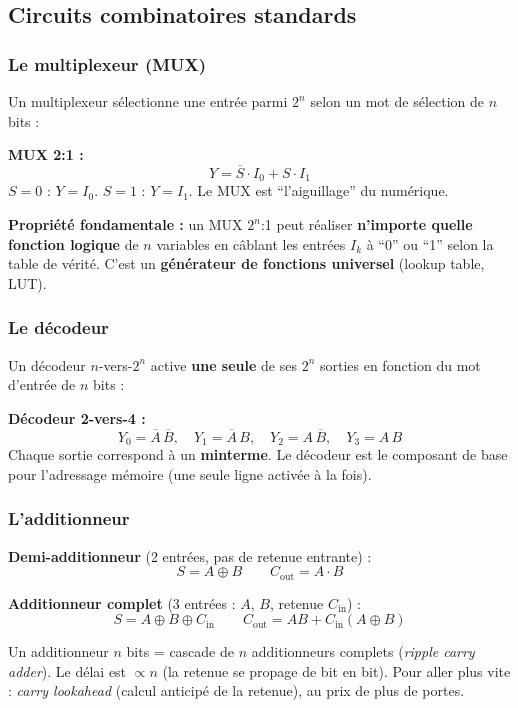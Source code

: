 \documentclass[12pt,a4paper,twoside]{book}
\begin{document}
\subsection{Circuits combinatoires standards}

\subsubsection*{Le multiplexeur (MUX)}

Un multiplexeur sélectionne une entrée parmi $2^n$ selon un mot de sélection de $n$ bits :

\begin{formule}
\textbf{MUX 2:1 :}
\[
Y = \overline{S} \cdot I_0 + S \cdot I_1
\]
$S = 0$ : $Y = I_0$. $S = 1$ : $Y = I_1$. Le MUX est ``l'aiguillage'' du numérique.

\textbf{Propriété fondamentale :} un MUX $2^n$:1 peut réaliser \textbf{n'importe quelle fonction logique} de $n$ variables en câblant les entrées $I_k$ à ``0'' ou ``1'' selon la table de vérité. C'est un \textbf{générateur de fonctions universel} (lookup table, LUT).
\end{formule}

\subsubsection*{Le décodeur}

Un décodeur $n$-vers-$2^n$ active \textbf{une seule} de ses $2^n$ sorties en fonction du mot d'entrée de $n$ bits :

\begin{formule}
\textbf{Décodeur 2-vers-4 :}
\[
Y_0 = \overline{A}\,\overline{B}, \quad Y_1 = \overline{A}\,B, \quad Y_2 = A\,\overline{B}, \quad Y_3 = A\,B
\]
Chaque sortie correspond à un \textbf{minterme}. Le décodeur est le composant de base pour l'adressage mémoire (une seule ligne activée à la fois).
\end{formule}

\subsubsection*{L'additionneur}

\begin{formule}
\textbf{Demi-additionneur} (2 entrées, pas de retenue entrante) :
\[
S = A \oplus B \qquad C_{\text{out}} = A \cdot B
\]

\textbf{Additionneur complet} (3 entrées : $A$, $B$, retenue $C_{\text{in}}$) :
\[
S = A \oplus B \oplus C_{\text{in}} \qquad C_{\text{out}} = AB + C_{\text{in}}(A \oplus B)
\]

Un additionneur $n$ bits = cascade de $n$ additionneurs complets (\textit{ripple carry adder}). Le délai est $\propto n$ (la retenue se propage de bit en bit). Pour aller plus vite : \textit{carry lookahead} (calcul anticipé de la retenue), au prix de plus de portes.
\end{formule}
\end{document}
